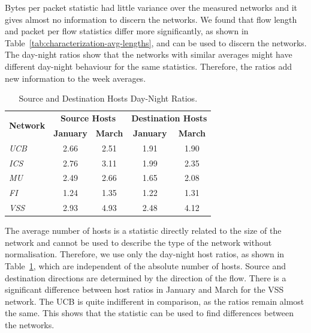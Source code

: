 Bytes per packet statistic had little variance over the measured networks and it gives almost no information to discern the networks. We found that flow length and packet per flow statistics differ more significantly, as shown in Table~\ref{tab:characterization-avg-lengths}, and can be used to discern the networks. The day-night ratios show that the networks with similar averages might have different day-night behaviour for the same statistics. Therefore, the ratios add new information to the week averages.

\begin{table}[!t]
        \centering
        \renewcommand{\arraystretch}{1.1}
        \begin{tabular}{|l|c|c|c|c|} \hline
                \multirow{2}{*}{\centering\textbf{Network}} & \multicolumn{2}{c|}{\textbf{Source Hosts}} & \multicolumn{2}{c|}{\textbf{Destination Hosts}} \\ \cline{2-5}
                  & \textbf{January} & \textbf{March} & \textbf{January} & \textbf{March} \\ \hline
                
                \textit{UCB} & 2.66 & 2.51 & 1.91 & 1.90 \\ \hline
                \textit{ICS} & 2.76 & 3.11 & 1.99 & 2.35 \\ \hline
                 \textit{MU} & 2.49 & 2.66 & 1.65 & 2.08 \\ \hline
                \textit{FI} & 1.24 & 1.35 & 1.22  & 1.31 \\ \hline
                \textit{VSS} & 2.93 & 4.93 & 2.48 & 4.12 \\ \hline
        \end{tabular}
        \caption{Source and Destination Hosts Day-Night Ratios.}
        \label{tab:characterization-day-night-hosts-ratio}
\end{table}

The average number of hosts is a statistic directly related to the size of the network and cannot be used to describe the type of the network without normalisation. Therefore, we use only the day-night host ratios, as shown in Table~\ref{tab:characterization-day-night-hosts-ratio}, which are independent of the absolute number of hosts. Source and destination directions are determined by the direction of the flow. There is a significant difference between host ratios in January and March for the VSS network. The UCB is quite indifferent in comparison, as the ratios remain almost the same. This shows that the statistic can be used to find differences between the networks.

